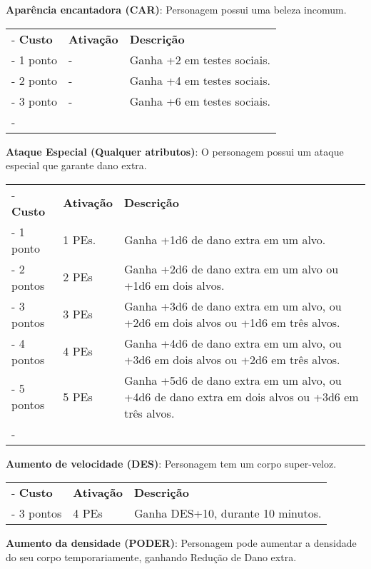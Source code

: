 \begin{small}
\textbf{Aparência encantadora (CAR)}: Personagem possui uma beleza incomum. 

	\begin{tabu}{|X[c]|X[c]|X[3 c]|} \tabucline-
		\textbf{Custo} 	& \textbf{Ativação}	&	\textbf{Descrição} \\ \tabucline-
		1 ponto					&	- 							&	Ganha +2 em testes sociais. \\ \tabucline-
		2 ponto					&	-							&	Ganha +4 em testes sociais. \\ \tabucline-
		3 ponto					&	-							&	Ganha +6 em testes sociais. \\ \tabucline-
	\end{tabu}


\textbf{Ataque Especial (Qualquer atributos)}: O personagem possui um ataque especial que garante dano extra.

	\begin{tabu}{|X[c]|X[c]|X[3]|} \tabucline-
	\textbf{Custo} 	& \textbf{Ativação}	&	\textbf{Descrição} \\ \tabucline-
	1 ponto		&	1 PEs. 			& Ganha +1d6 de dano extra em um alvo. \\ \tabucline-
	2 pontos	&	2 PEs 			& Ganha +2d6 de dano extra em um alvo ou +1d6 em dois alvos. \\ \tabucline-
	3 pontos	&	3 PEs 			& Ganha +3d6 de dano extra em um alvo, ou +2d6 em dois alvos ou +1d6 em três alvos.\\ \tabucline-
	4 pontos	&	4 PEs 			& Ganha +4d6 de dano extra em um alvo, ou +3d6 em dois alvos ou +2d6 em três alvos. \\ \tabucline-
	5 pontos	&	5 PEs 			& Ganha +5d6 de dano extra em um alvo, ou +4d6 de dano extra em dois alvos ou +3d6 em três alvos. \\ \tabucline-
	\end{tabu}


\textbf{Aumento de velocidade (DES)}: Personagem tem um corpo super-veloz.

	\begin{tabu}{|X[c]|X[c]|X[3]|} \tabucline-
		\textbf{Custo} 		& \textbf{Ativação}		&	\textbf{Descrição} \\ \tabucline-
		3 pontos			&	4 PEs				&	Ganha DES+10, durante 10 minutos. \\ \hline
	\end{tabu}



\textbf{Aumento da densidade (PODER)}: Personagem pode aumentar a densidade do seu corpo temporariamente, ganhando Redução de Dano extra.


\end{small}
